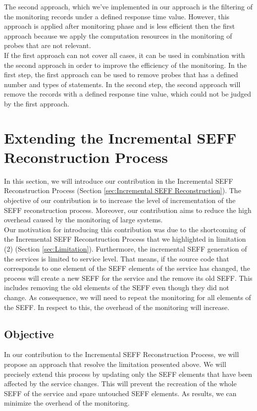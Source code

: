 The second approach, which we've implemented in our approach is the filtering of the monitoring records under a defined response time value. However, this approach is applied after monitoring phase and is less efficient then the first approach because we apply the computation resources in the monitoring of probes that are not relevant. \\

If the first approach can not cover all cases, it can be used in combination with the second approach in order to improve the efficiency of the monitoring. In the first step, the first approach can be used to remove probes that has a defined number and types of statements. In the second step, the second approach will remove the records with a defined response tine value, which could not be judged by the first approach.\\

\section{Extending the Incremental SEFF Reconstruction Process}
\label{sec:extend the incremental SEFF reconstruction process}
In this section, we will introduce our contribution in the Incremental SEFF Reconstruction Process (Section \ref{sec:Incremental SEFF Reconstruction}). The objective of our contribution is to increase the level of incrementation of the SEFF reconstruction process. Moreover, our contribution aims to reduce the high overhead caused by the monitoring of large systems.\\

Our motivation for introducing this contribution was due to the shortcoming of the Incremental SEFF Reconstruction Process that we highlighted in limitation (2) (Section \ref{sec:Limitation}). Furthermore, the incremental SEFF generation of the services is limited to service level. That means, if the source code that corresponds to one element of the SEFF elements of the service has changed, the process will create a new SEFF for the service and the remove its old SEFF. This includes removing the old elements of the SEFF even though they did not change. As consequence, we will need to repeat the monitoring for all elements of the SEFF. In respect to this, the overhead of the monitoring will increase.

\subsection{Objective}
\label{sec:objective}
In our contribution to the Incremental SEFF Reconstruction Process, we will propose an approach that resolve the limitation presented above. We will precisely extend this process by updating only the SEFF elements that have been affected by the service changes. This will prevent the recreation of the whole SEFF of the service and spare untouched SEFF elements. As results, we can minimize the overhead of the monitoring. 

